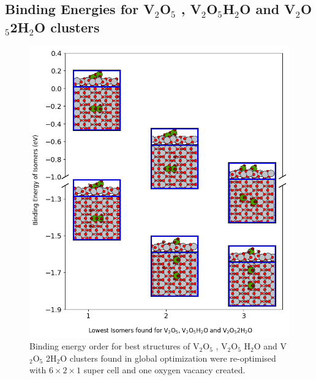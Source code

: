 \documentclass[aip,amsmath,amssymb,reprint, jcp]{revtex4-1}
\begin{document}
\subsection{Binding Energies for V$_2$O$_5$ , V$_2$O$_5$H$_2$O and  V$_2$O$_5$2H$_2$O clusters}
\begin{figure}
\centering
\includegraphics[width=1.0\textwidth]{BE_order_1Ov_2ndrow_V2O5clu_TiO2_101sur.png}
\caption{Binding energy order for best structures of V$_2$O$_5$ , V$_2$O$_5$ H$_2$O and V$_2$O$_5$ 2H$_2$O clusters found in global optimization were re-optimised with $6 \times 2 \times 1$ super cell  and  one oxygen vacancy created.}
\label{fig:BE_1Ov}
\end{figure}
\end{document}

